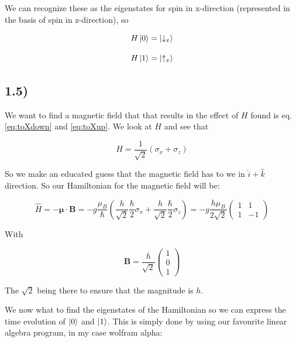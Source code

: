 \documentclass[a4paper,norsk, 10pt]{article}
\begin{document}
We can recognize these as the eigenstates for spin in x-direction (represented in the basis of spin in z-direction), so

\begin{equation}
H\ket{0} = \ket{\downarrow_x}
\label{eq:toXdown}
\end{equation}

\begin{equation}
H\ket{1} = \ket{\uparrow_x}
\label{eq:toXup}
\end{equation}


\subsection{1.5)}
We want to find a magnetic field that that results in the effect of $H$ found is eq. \eqref{eq:toXdown} and \eqref{eq:toXup}. We look at $H$ and see that

\begin{equation}
H = \frac{1}{\sqrt{2}}\left(\sigma_x + \sigma_z\right)
\end{equation}

So we make an educated guess that the magnetic field has to we in $\hat{i} + \hat{k}$ direction. So our Hamiltonian for the magnetic field will be:

\begin{equation}
\hat{H} = -\mathbf{\mu}\cdot \mathbf{B} = - g\frac{\mu_B}{\hbar}\left(\frac{h}{\sqrt{2}}\frac{\hbar}{2}\sigma_x + \frac{h}{\sqrt{2}}\frac{\hbar}{2}\sigma_z\right) = -g\frac{h\mu_B}{2\sqrt{2}}
\begin{pmatrix}
1 & 1 \\
1 & -1
\end{pmatrix}
\end{equation}

With

\begin{equation}
\mathbf{B} = \frac{h}{\sqrt{2}}
\begin{pmatrix}
1 \\ 0 \\ 1
\end{pmatrix}
\end{equation}

The $\sqrt{2}$ being there to ensure that the magnitude is $h$. 

We now what to find the eigenstates of the Hamiltonian so we can express the time evolution of $\ket{0}$ and $\ket{1}$. This is simply done by using our favourite linear algebra program, in my case wolfram alpha:
\end{document}
